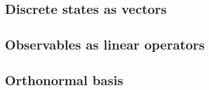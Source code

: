 
\subsection{Discrete states as vectors}

\subsection{Observables as linear operators}

\subsection{Orthonormal basis}


